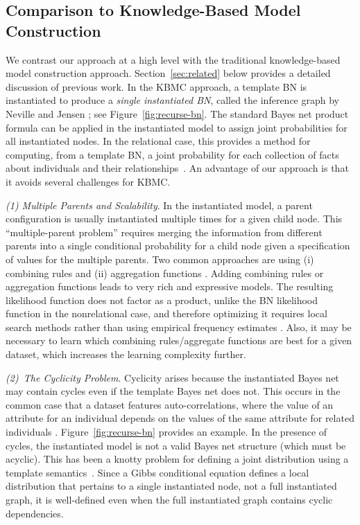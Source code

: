 \documentclass[twoside,11pt]{article}
\newcommand{\point}[1]{\noindent\emph{#1}.}
\begin{document}
\subsection{Comparison to Knowledge-Based Model Construction} \label{sec:kbmc} We contrast our approach at a high level with the traditional knowledge-based model construction approach. Section~\ref{sec:related} below provides a detailed discussion of previous work. In the KBMC approach, a template BN is instantiated to produce a {\em single instantiated BN}, called the inference graph by Neville and Jensen \cite{Neville2007}; see Figure~\ref{fig:recurse-bn}. The standard Bayes net product formula can be applied in the instantiated model to assign joint probabilities for all instantiated nodes. In the relational case, this provides a method for computing, from a template BN, a joint probability for each collection of facts about individuals and their relationships~\cite{Getoor2007c,Kersting2007}. An advantage of our approach is that it avoids several challenges for KBMC. 

\point{(1) Multiple Parents and Scalability} In the instantiated model, a parent configuration is usually instantiated multiple times for a given child node. This ``multiple-parent problem'' \cite{Natarajan2008} requires merging the information from different parents into a single conditional probability for a child node given a specification of values for the multiple parents. Two common approaches are using (i) combining rules \cite{Kersting2007} and (ii) aggregation functions \cite{Getoor2007c}. Adding combining rules or aggregation functions leads to very rich and expressive models. The resulting likelihood function does not factor as a product, unlike the BN likelihood function in the nonrelational case, and therefore optimizing it requires local search methods rather than using empirical frequency estimates  \cite{Kersting2007,Natarajan2009}. Also, it may be necessary to learn which combining rules/aggregate functions are best for a given dataset, which increases the learning complexity further.


\point{(2)~The Cyclicity Problem} Cyclicity arises because the instantiated Bayes net may contain cycles even if the template Bayes net does not.
This occurs in the common case that a dataset features auto-correlations, where the value of an attribute for an individual depends on the values of the same attribute for related individuals \cite{Neville2007,Schulte2012a}. Figure~\ref{fig:recurse-bn}  provides an example.
In the presence of cycles, the instantiated model is not a valid Bayes net structure (which must be acyclic).
This has been a knotty problem for defining a joint distribution using a template semantics~\cite{Domingos2007,Taskar2002,Getoor2007c}. Since a Gibbs conditional equation defines a local distribution that pertains to a single instantiated node, not a full instantiated graph, it is well-defined even when the full instantiated graph contains cyclic dependencies.
\end{document}
